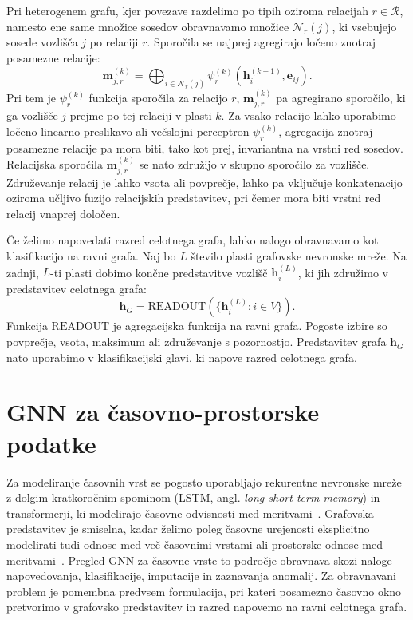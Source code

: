 Pri heterogenem grafu, kjer povezave razdelimo po tipih oziroma relacijah $r \in \mathcal{R}$, namesto ene same množice sosedov obravnavamo množice $\mathcal{N}_r(j)$, ki vsebujejo sosede vozlišča $j$ po relaciji $r$.
Sporočila se najprej agregirajo ločeno znotraj posamezne relacije:
\begin{equation}
    \mathbf{m}_{j,r}^{(k)} =
    \bigoplus_{i \in \mathcal{N}_r(j)}
    \psi_r^{(k)}
    \left(
        \mathbf{h}_i^{(k-1)},
        \mathbf{e}_{ij}
    \right).
    \label{eq:heterogeno-posredovanje-sporocil}
\end{equation}
Pri tem je $\psi_r^{(k)}$ funkcija sporočila za relacijo $r$, $\mathbf{m}_{j,r}^{(k)}$ pa agregirano sporočilo, ki ga vozlišče $j$ prejme po tej relaciji v plasti $k$.
Za vsako relacijo lahko uporabimo ločeno linearno preslikavo ali večslojni perceptron $\psi_r^{(k)}$, agregacija znotraj posamezne relacije pa mora biti, tako kot prej, invariantna na vrstni red sosedov.
Relacijska sporočila $\mathbf{m}_{j,r}^{(k)}$ se nato združijo v skupno sporočilo za vozlišče.
Združevanje relacij je lahko vsota ali povprečje, lahko pa vključuje konkatenacijo oziroma učljivo fuzijo relacijskih predstavitev, pri čemer mora biti vrstni red relacij vnaprej določen.

Če želimo napovedati razred celotnega grafa, lahko nalogo obravnavamo kot klasifikacijo na ravni grafa.
Naj bo $L$ število plasti grafovske nevronske mreže.
Na zadnji, $L$-ti plasti dobimo končne predstavitve vozlišč $\mathbf{h}_i^{(L)}$, ki jih združimo v predstavitev celotnega grafa:
\begin{equation}
    \mathbf{h}_G =
    \text{READOUT}
    \left(
        \{\mathbf{h}_i^{(L)} : i \in V\}
    \right).
    \label{eq:klasifikacija-grafa-readout}
\end{equation}
Funkcija $\text{READOUT}$ je agregacijska funkcija na ravni grafa.
Pogoste izbire so povprečje, vsota, maksimum ali združevanje s pozornostjo.
Predstavitev grafa $\mathbf{h}_G$ nato uporabimo v klasifikacijski glavi, ki napove razred celotnega grafa.

\section{GNN za časovno-prostorske podatke}
\label{subsec:gnn-casovno-prostorski-podatki}

Za modeliranje časovnih vrst se pogosto uporabljajo rekurentne nevronske mreže z dolgim kratkoročnim spominom (LSTM, angl. \emph{long short-term memory}) in transformerji, ki modelirajo časovne odvisnosti med meritvami~\cite{jin2024gnn4ts}.
Grafovska predstavitev je smiselna, kadar želimo poleg časovne urejenosti eksplicitno modelirati tudi odnose med več časovnimi vrstami ali prostorske odnose med meritvami~\cite{jin2024gnn4ts}.
Pregled GNN za časovne vrste to področje obravnava skozi naloge napovedovanja, klasifikacije, imputacije in zaznavanja anomalij.
Za obravnavani problem je pomembna predvsem formulacija, pri kateri posamezno časovno okno pretvorimo v grafovsko predstavitev in razred napovemo na ravni celotnega grafa.

